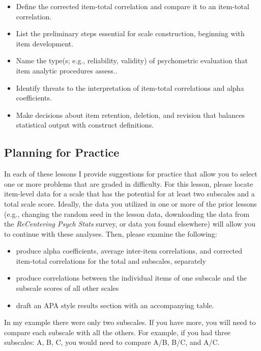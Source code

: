 \documentclass[
  english,
]{book}
\providecommand{\tightlist}{%
  \setlength{\itemsep}{0pt}\setlength{\parskip}{0pt}}
\begin{document}
\begin{itemize}
\tightlist
\item
  Define the corrected item-total correlation and compare it to an item-total correlation.
\item
  List the preliminary steps essential for scale construction, beginning with item development.
\item
  Name the type(s; e.g., reliability, validity) of psychometric evaluation that item analytic procedures assess..
\item
  Identify threats to the interpretation of item-total correlations and alpha coefficients.
\item
  Make decisions about item retention, deletion, and revision that balances statistical output with construct definitions.
\end{itemize}

\hypertarget{planning-for-practice-5}{%
\subsection{Planning for Practice}\label{planning-for-practice-5}}

In each of these lessons I provide suggestions for practice that allow you to select one or more problems that are graded in difficulty. For this lesson, please locate item-level data for a scale that has the potential for at least two subscales and a total scale score. Ideally, the data you utilized in one or more of the prior lessons (e.g., changing the random seed in the lesson data, downloading the data from the \emph{ReCentering Psych Stats} survey, or data you found elsewhere) will allow you to continue with these analyses. Then, please examine the following:

\begin{itemize}
\tightlist
\item
  produce alpha coefficients, average inter-item correlations, and corrected item-total correlations for the total and subscales, separately
\item
  produce correlations between the individual items of one subscale and the subscale scores of all other scales
\item
  draft an APA style results section with an accompanying table.
\end{itemize}

In my example there were only two subscales. If you have more, you will need to compare each subscale with all the others. For example, if you had three subscales: A, B, C, you would need to compare A/B, B/C, and A/C.
\end{document}
